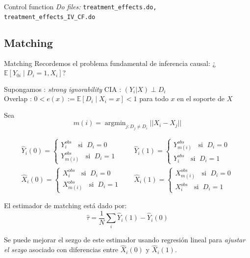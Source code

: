 \documentclass[8pt]{beamer}
\begin{document}
\begin{frame}[allowframebreaks]{Control function}
{\footnotesize \textit{Do files: } \texttt{treatment\_effects.do, treatment\_effects\_IV\_CF.do}}  
\end{frame}



\subsection{Matching}
\begin{frame}{Matching}
    Recordemos el problema fundamental de inferencia causal: ¿$\mathbb{E}[Y_{0i}\;|\;D_i=1, X_i]$?
    
    \begin{block}{Supongamos : \emph{strong ignorability}}
     CIA : $(Y_i | X) \perp D_i$\\
     Overlap : $0<e(x):=\mathbb{E}[D_i\;|\;X_i=x]<1$ para todo $x$ en el soporte de $X$
    \end{block}
    \pause
    Sea 
    \[m(i) = \operatorname{argmin}_{j : D_j\neq D_i}||X_i-X_j||\]
    
    \begin{align*}
        \hat Y_i(0) = \begin{cases}
        Y_i^{obs} \;\;\text{ si } \;D_i=0\\
        Y_{m(i)}^{obs} \;\;\text{ si } \;D_i=1
        \end{cases}
        \;\;&\;\;
      \hat Y_i(1) = \begin{cases}
        Y_{m(i)}^{obs} \;\;\text{ si } \;D_i=0\\
        Y_i^{obs} \;\;\text{ si } \;D_i=1
        \end{cases}    \\
        \hat X_i(0) = \begin{cases}
        X_i^{obs} \;\;\text{ si } \;D_i=0\\
        X_{m(i)}^{obs} \;\;\text{ si } \;D_i=1
        \end{cases}
        \;\;&\;\;
      \hat X_i(1) = \begin{cases}
        X_{m(i)}^{obs} \;\;\text{ si } \;D_i=0\\
        X_i^{obs} \;\;\text{ si } \;D_i=1
        \end{cases}          
    \end{align*}
    
El estimador de matching está dado por:
\[\hat\tau=\frac{1}{N}\sum_{i}\hat Y_i(1)-\hat Y_i(0)\]

\pause
Se puede mejorar el sezgo de este estimador usando regresión lineal para \emph{ajustar el sezgo} asociado con diferencias entre $\hat X_i(0)$ y $\hat X_i(1)$.
\end{frame}
\end{document}
